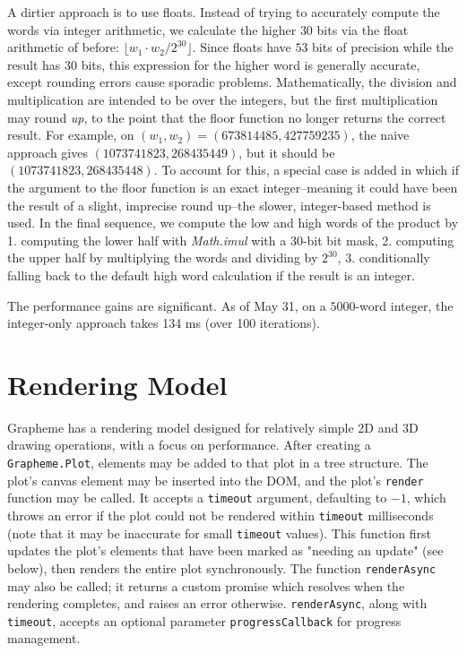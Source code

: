 \documentclass{article}
\begin{document}
A dirtier approach is to use floats. Instead of trying to accurately compute the words via integer arithmetic, we calculate the higher $30$ bits via the float arithmetic of before: $\lfloor w_1\cdot w_2 / 2^{30} \rfloor$. Since floats have $53$ bits of precision while the result has $30$ bits, this expression for the higher word is generally accurate, except rounding errors cause sporadic problems. Mathematically, the division and multiplication are intended to be over the integers, but the first multiplication may round \textit{up}, to the point that the floor function no longer returns the correct result. For example, on $(w_1,w_2)=(673814485,427759235)$, the naive approach gives $(1073741823, 268435449)$, but it should be $(1073741823, 268435448)$. To account for this, a special case is added in which if the argument to the floor function is an exact integer--meaning it could have been the result of a slight, imprecise round up--the slower, integer-based method is used. In the final sequence, we compute the low and high words of the product by 1. computing the lower half with \textit{Math.imul} with a $30$-bit bit mask, 2. computing the upper half by multiplying the words and dividing by $2^{30}$, 3. conditionally falling back to the default high word calculation if the result is an integer.

The performance gains are significant. As of May 31, on a $5000$-word integer, the integer-only approach takes 134 ms (over 100 iterations).

\section{Rendering Model}

Grapheme has a rendering model designed for relatively simple 2D and 3D drawing operations, with a focus on performance. After creating a \texttt{Grapheme.Plot}, elements may be added to that plot in a tree structure. The plot's canvas element may be inserted into the DOM, and the plot's \texttt{render} function may be called. It accepts a \texttt{timeout} argument, defaulting to $-1$, which throws an error if the plot could not be rendered within \texttt{timeout} milliseconds (note that it may be inaccurate for small \texttt{timeout} values). This function first updates the plot's elements that have been marked as "needing an update" (see below), then renders the entire plot synchronously. The function \texttt{renderAsync} may also be called; it returns a custom promise which resolves when the rendering completes, and raises an error otherwise. \texttt{renderAsync}, along with \texttt{timeout}, accepts an optional parameter \texttt{progressCallback} for progress management.
\end{document}
